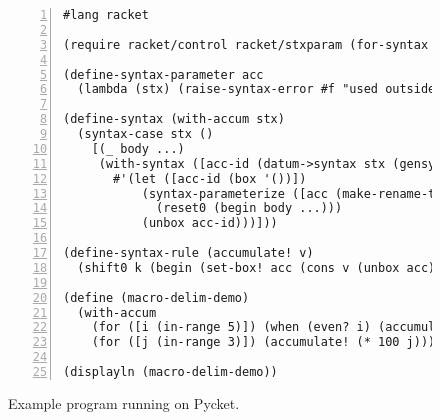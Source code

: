 \begin{figure}[!h]
\centering

\begin{minipage}{\textwidth}
\begin{lstlisting}[language=racket,
                basicstyle=\ttfamily\footnotesize,
                numbers=left, xleftmargin=2em, numberstyle=\tiny]
#lang racket

(require racket/control racket/stxparam (for-syntax racket/base))

(define-syntax-parameter acc
  (lambda (stx) (raise-syntax-error #f "used outside of with-accum" stx)))

(define-syntax (with-accum stx)
  (syntax-case stx ()
    [(_ body ...)
     (with-syntax ([acc-id (datum->syntax stx (gensym 'acc))])
       #'(let ([acc-id (box '())])
           (syntax-parameterize ([acc (make-rename-transformer #'acc-id)])
             (reset0 (begin body ...)))
           (unbox acc-id)))]))

(define-syntax-rule (accumulate! v)
  (shift0 k (begin (set-box! acc (cons v (unbox acc))) (k (void)))))

(define (macro-delim-demo)
  (with-accum
    (for ([i (in-range 5)]) (when (even? i) (accumulate! i)))
    (for ([j (in-range 3)]) (accumulate! (* 100 j)))))

(displayln (macro-delim-demo))
\end{lstlisting}
\caption{Example  program running on Pycket.}
\label{fig:pycket-works-big-example}
\end{minipage}
\end{figure}